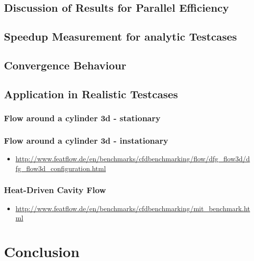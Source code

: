 \documentclass[article,type=msc,colorback,accentcolor=tud2a]{tudthesis}
\begin{document}
      \subsection{Discussion of Results for Parallel Efficiency}
      \subsection{Speedup Measurement for analytic Testcases}
    \subsection{Convergence Behaviour}
    \subsection{Application in Realistic Testcases}
      
      \subsubsection{Flow around a cylinder 3d - stationary}
      \subsubsection{Flow around a cylinder 3d - instationary}
        \begin{itemize}
          \item\url{http://www.featflow.de/en/benchmarks/cfdbenchmarking/flow/dfg_flow3d/dfg_flow3d_configuration.html}
        \end{itemize}

      \subsubsection{Heat-Driven Cavity Flow}
        \begin{itemize}
          \item \url{http://www.featflow.de/en/benchmarks/cfdbenchmarking/mit_benchmark.html}
        \end{itemize}
      

  \section{Conclusion}
\end{document}
